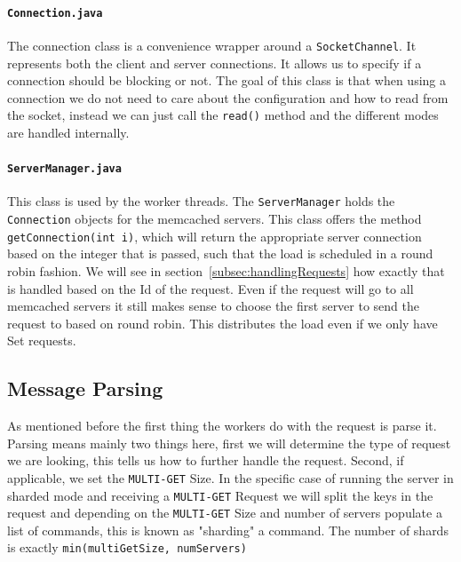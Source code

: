 \documentclass[11pt,a4paper]{article}
\begin{document}
\paragraph{\texttt{Connection.java}}
%
The connection class is a convenience wrapper around a \texttt{SocketChannel}.
%
It represents both the client and server connections.
%
It allows us to specify if a connection should be blocking or not.
%
The goal of this class is that when using a connection we do not need to care about the configuration and how to read from the socket, instead we can just call the \texttt{read()} method and the different modes are handled internally.
%
\paragraph{\texttt{ServerManager.java}}
%
This class is used by the worker threads.
%
The \texttt{ServerManager} holds the \texttt{Connection} objects for the memcached servers.
%
This class offers the method \texttt{getConnection(int i)}, which will return the appropriate server connection based on the integer that is passed, such that the load is scheduled in a round robin fashion.
%
We will see in section~\ref{subsec:handlingRequests} how exactly that is handled based on the Id of the request.
%
Even if the request will go to all memcached servers it still makes sense to choose the first server to send the request to based on round robin.
%
This distributes the load even if we only have Set requests.
%
\subsection{Message Parsing}
%
As mentioned before the first thing the workers do with the request is parse it.
%
Parsing means mainly two things here, first we will determine the type of request we are looking, this tells us how to further handle the request.
%
Second, if applicable, we set the \texttt{MULTI-GET} Size.
%
In the specific case of running the server in sharded mode and receiving a \texttt{MULTI-GET} Request we will split the keys in the request and depending on the \texttt{MULTI-GET} Size and number of servers populate a list of commands, this is known as "sharding" a command.
%
The number of shards is exactly \texttt{min(multiGetSize, numServers)}
%
\end{document}

